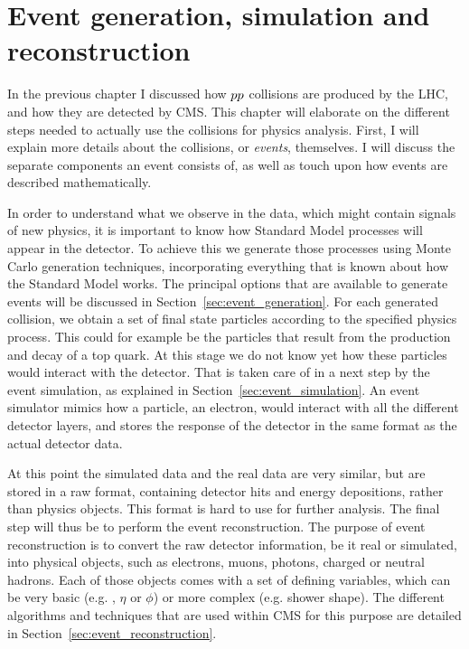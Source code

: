 \chapter[Event generation, simulation, reconstruction]{Event generation, simulation and
reconstruction \label{chap:event_generation}}

In the previous chapter I discussed how ${p}{p}$ collisions are produced by the LHC, and
how they are detected by CMS. This chapter will elaborate on the different
steps needed to actually use the collisions for physics analysis. 
First, I will explain more details about the collisions, or \textit{events}, themselves. I will
discuss the separate components an event consists of, as well as touch upon how events are described
mathematically. 

In order to understand what we observe in the data, which might contain signals of new physics, it
is important to know how Standard Model processes will appear in the detector. To achieve this we
generate those processes using Monte Carlo generation techniques, incorporating everything that is
known about how the Standard Model works. The principal options that are available to generate
events will be discussed in Section~\ref{sec:event_generation}. 
For each generated collision, we obtain a set of final state particles according to the specified
physics process. This could for example be the particles that result from the production and decay
of a top quark. 
At this stage we do not know yet how these particles would interact with the detector. That is
taken care of in a next step by the event simulation, as explained in
Section~\ref{sec:event_simulation}. An event simulator mimics how a particle, \eg an electron,
would interact with all the different detector layers, and stores the response of the detector in
the same format as the actual detector data. 

At this point the simulated data and the real data are very similar, but are stored in a raw format,
containing detector hits and energy depositions, rather than physics objects. This format is hard to
use for further analysis. The final step will thus be to perform the event reconstruction. The
purpose of event reconstruction is to convert the raw detector information, be it real or simulated,
into physical objects, such as electrons, muons, photons, charged or neutral hadrons. Each of those
objects comes with a set of defining variables, which can be very basic (e.g. \pt, $\eta$ or $\phi$)
or more complex (e.g. shower shape). The different algorithms and techniques that are used within
CMS for this purpose are detailed in Section~\ref{sec:event_reconstruction}. 

